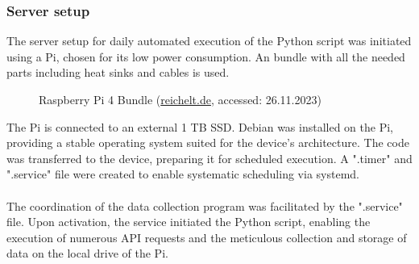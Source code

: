 \subsubsection{Server setup}\label{sec: server setup}
The server setup for daily automated execution of the Python script was initiated using a \ac{Pi}, chosen for its low power consumption. An bundle with all the needed parts including heat sinks and cables is used.
\begin{figure}[H]
	\centering
	\caption[Raspberry Pi 4 Bundle]{Raspberry Pi 4 Bundle (\url{reichelt.de}, accessed: 26.11.2023)}
	\label{fig: Raspi}
\end{figure}
The \ac{Pi} is connected to an external 1 TB \ac{SSD}. Debian was installed on the \ac{Pi}, providing a stable operating system suited for the device's architecture. The code was transferred to the device, preparing it for scheduled execution. A ".timer" and ".service" file were created to enable systematic scheduling via systemd.\\
\\
The coordination of the data collection program was facilitated by the ".service" file. Upon activation, the service initiated the Python script, enabling the execution of numerous \ac{API} requests and the meticulous collection and storage of data on the local drive of the \ac{Pi}. 
